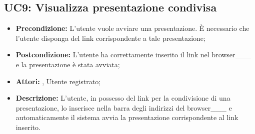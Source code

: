 \subsection{ UC9: Visualizza presentazione condivisa}

\begin{itemize}
	\item \textbf{Precondizione:} L’utente vuole avviare una presentazione. È necessario che l’utente disponga del link corrispondente a tale presentazione;
	\item \textbf{Postcondizione:} L’utente ha correttamente inserito il link nel browser___ e la presentazione è stata avviata;
	\item \textbf{Attori:} , Utente registrato;
	\item \textbf{Descrizione:} L’utente, in possesso del link per la condivisione di una presentazione, lo inserisce nella barra degli indirizzi del browser___ e automaticamente il sistema avvia la presentazione corrispondente al link inserito.
\end{itemize}

